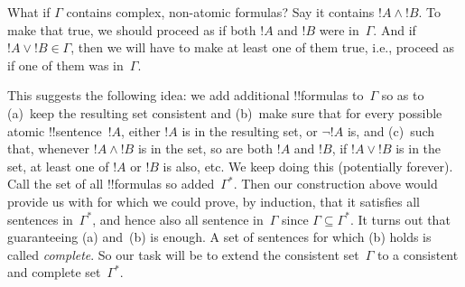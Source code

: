 \documentclass[../../../include/open-logic-section]{subfiles}
\begin{document}
What if $\Gamma$ contains complex, non-atomic formulas? Say it
contains $!A \land !B$. To make that true, we should proceed as if
both $!A$ and $!B$ were in~$\Gamma$.  And if $!A \lor !B \in \Gamma$,
then we will have to make at least one of them true, i.e., proceed as
if one of them was in~$\Gamma$.

This suggests the following idea: we add additional !!{formula}s
to~$\Gamma$ so as to (a)~keep the resulting set consistent and
(b)~make sure that for every possible atomic !!{sentence}~$!A$, either
$!A$ is in the resulting set, or $\lnot !A$ is, and (c)~such that,
whenever $!A \land !B$ is in the set, so are both $!A$ and $!B$, if
$!A \lor !B$ is in the set, at least one of $!A$ or $!B$ is also, etc.
We keep doing this (potentially forever).  Call the set of all
!!{formula}s so added~$\Gamma^*$.  Then our construction above would
provide us with 
for which we could prove, by induction, that it satisfies all sentences
in~$\Gamma^*$, and hence also all sentence in~$\Gamma$
since $\Gamma \subseteq \Gamma^*$.  It turns out that guaranteeing (a)
and~(b) is enough. A set of sentences for which (b) holds is called
\emph{complete}. So our task will be to extend the consistent
set~$\Gamma$ to a consistent and complete set~$\Gamma^*$.
\end{document}
